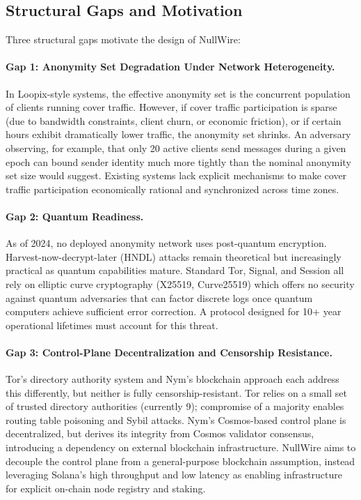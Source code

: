 \documentclass[11pt]{article}
\theoremstyle{definition}
\theoremstyle{remark}
\begin{document}
\subsection{Structural Gaps and Motivation}

Three structural gaps motivate the design of NullWire:

\paragraph{Gap 1: Anonymity Set Degradation Under Network Heterogeneity.} In Loopix-style systems, the effective anonymity set is the concurrent population of clients running cover traffic. However, if cover traffic participation is sparse (due to bandwidth constraints, client churn, or economic friction), or if certain hours exhibit dramatically lower traffic, the anonymity set shrinks. An adversary observing, for example, that only 20 active clients send messages during a given epoch can bound sender identity much more tightly than the nominal anonymity set size would suggest. Existing systems lack explicit mechanisms to make cover traffic participation economically rational and synchronized across time zones.

\paragraph{Gap 2: Quantum Readiness.} As of 2024, no deployed anonymity network uses post-quantum encryption. Harvest-now-decrypt-later (HNDL) attacks remain theoretical but increasingly practical as quantum capabilities mature. Standard Tor, Signal, and Session all rely on elliptic curve cryptography (X25519, Curve25519) which offers no security against quantum adversaries that can factor discrete logs once quantum computers achieve sufficient error correction. A protocol designed for 10+ year operational lifetimes must account for this threat.

\paragraph{Gap 3: Control-Plane Decentralization and Censorship Resistance.} Tor's directory authority system and Nym's blockchain approach each address this differently, but neither is fully censorship-resistant. Tor relies on a small set of trusted directory authorities (currently 9); compromise of a majority enables routing table poisoning and Sybil attacks. Nym's Cosmos-based control plane is decentralized, but derives its integrity from Cosmos validator consensus, introducing a dependency on external blockchain infrastructure. NullWire aims to decouple the control plane from a general-purpose blockchain assumption, instead leveraging Solana's high throughput and low latency as enabling infrastructure for explicit on-chain node registry and staking.
\end{document}
